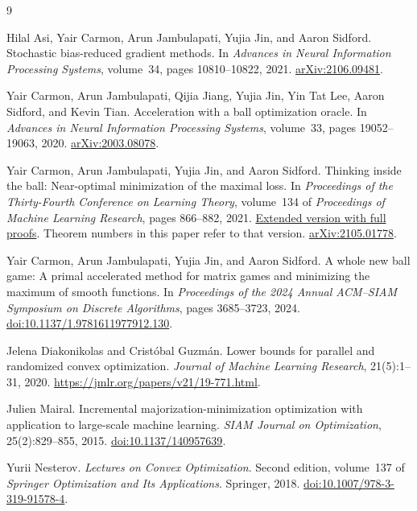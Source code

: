 \documentclass[11pt,a4paper]{article}
\theoremstyle{definition}\newtheorem{definition}[theorem]{Definition}
\theoremstyle{remark}\newtheorem{remark}[theorem]{Remark}
\begin{document}
\begin{thebibliography}{9}

Hilal Asi, Yair Carmon, Arun Jambulapati, Yujia Jin, and Aaron Sidford.
\newblock Stochastic bias-reduced gradient methods.
\newblock In \emph{Advances in Neural Information Processing Systems},
volume~34, pages 10810--10822, 2021.
\newblock \href{https://arxiv.org/abs/2106.09481}{arXiv:2106.09481}.

Yair Carmon, Arun Jambulapati, Qijia Jiang, Yujia Jin, Yin Tat Lee,
Aaron Sidford, and Kevin Tian.
\newblock Acceleration with a ball optimization oracle.
\newblock In \emph{Advances in Neural Information Processing Systems},
volume~33, pages 19052--19063, 2020.
\newblock \href{https://arxiv.org/abs/2003.08078}{arXiv:2003.08078}.

Yair Carmon, Arun Jambulapati, Yujia Jin, and Aaron Sidford.
\newblock Thinking inside the ball: Near-optimal minimization of the maximal loss.
\newblock In \emph{Proceedings of the Thirty-Fourth Conference on Learning Theory},
volume~134 of \emph{Proceedings of Machine Learning Research},
pages 866--882, 2021.
\newblock \href{https://proceedings.mlr.press/v134/carmon21a/carmon21a-supp.pdf}
{Extended version with full proofs}.
\newblock Theorem numbers in this paper refer to that version.
\newblock \href{https://arxiv.org/abs/2105.01778}{arXiv:2105.01778}.

Yair Carmon, Arun Jambulapati, Yujia Jin, and Aaron Sidford.
\newblock A whole new ball game: A primal accelerated method for matrix games
and minimizing the maximum of smooth functions.
\newblock In \emph{Proceedings of the 2024 Annual ACM--SIAM Symposium on
Discrete Algorithms}, pages 3685--3723, 2024.
\newblock \href{https://doi.org/10.1137/1.9781611977912.130}
{doi:10.1137/1.9781611977912.130}.

Jelena Diakonikolas and Crist\'obal Guzm\'an.
\newblock Lower bounds for parallel and randomized convex optimization.
\newblock \emph{Journal of Machine Learning Research}, 21(5):1--31, 2020.
\newblock \url{https://jmlr.org/papers/v21/19-771.html}.

Julien Mairal.
\newblock Incremental majorization-minimization optimization with application
to large-scale machine learning.
\newblock \emph{SIAM Journal on Optimization}, 25(2):829--855, 2015.
\newblock \href{https://doi.org/10.1137/140957639}{doi:10.1137/140957639}.

Yurii Nesterov.
\newblock \emph{Lectures on Convex Optimization}.
\newblock Second edition, volume~137 of \emph{Springer Optimization and
Its Applications}. Springer, 2018.
\newblock \href{https://doi.org/10.1007/978-3-319-91578-4}
{doi:10.1007/978-3-319-91578-4}.

\end{thebibliography}
\end{document}
